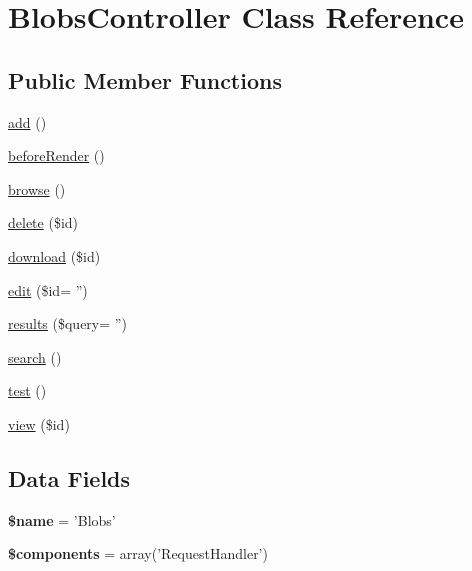 \hypertarget{class_blobs_controller}{
\section{BlobsController Class Reference}
\label{class_blobs_controller}
}
\subsection*{Public Member Functions}
\begin{DoxyCompactItemize}
\item 
\hyperlink{class_blobs_controller_a837ba24a1c3095ae67613238d866f79a}{add} ()
\item 
\hyperlink{class_blobs_controller_ac89dd29d2229bbc37879d31f95d06e97}{beforeRender} ()
\item 
\hyperlink{class_blobs_controller_af41f268d662f2a4ffbe597d0580467a1}{browse} ()
\item 
\hyperlink{class_blobs_controller_a2f8258add505482d7f00ea26493a5723}{delete} (\$id)
\item 
\hyperlink{class_blobs_controller_ad6a5f919a44257e2b5a5109cc6fc5fe2}{download} (\$id)
\item 
\hyperlink{class_blobs_controller_a9fd85873077eb2ff7e455de3b95af38f}{edit} (\$id= '')
\item 
\hyperlink{class_blobs_controller_ab633a32e024a1dc81243c199d7a8e4d7}{results} (\$query= '')
\item 
\hyperlink{class_blobs_controller_a796bf438724e047aeef18579732a3780}{search} ()
\item 
\hyperlink{class_blobs_controller_ad69dd4607977cae05ebe19d1ae604fb1}{test} ()
\item 
\hyperlink{class_blobs_controller_a93a99cdd06e6a3044ed7e56db0f9419a}{view} (\$id)
\end{DoxyCompactItemize}
\subsection*{Data Fields}
\begin{DoxyCompactItemize}
\item 
\hypertarget{class_blobs_controller_ab2fc40d43824ea3e1ce5d86dee0d763b}{
{\bfseries \$name} = 'Blobs'}
\label{class_blobs_controller_ab2fc40d43824ea3e1ce5d86dee0d763b}

\item 
\hypertarget{class_blobs_controller_a2409c247baf67a1d4c6b9a1789cfc088}{
{\bfseries \$components} = array('RequestHandler')}
\label{class_blobs_controller_a2409c247baf67a1d4c6b9a1789cfc088}

\end{DoxyCompactItemize}


